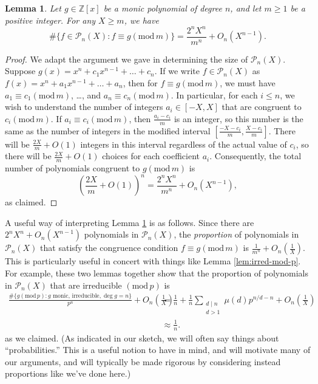 \documentclass[12pt]{amsart}
\newtheorem{lemma}[theorem]{Lemma}
\theoremstyle{definition} \newtheorem*{notation}{Notation}
\theoremstyle{remark} \newtheorem*{remark}{Remark}
\theoremstyle{remark} \newtheorem*{example}{Example}
\theoremstyle{definition} \newtheorem*{definition}{Definition}
\numberwithin{equation}{section}
\numberwithin{theorem}{section}
\renewcommand{\pmod}[1]{\left(\mathrm{mod}\,#1\right)}
\begin{document}
	\begin{lemma} \label{lem:poly-mod-m}
		Let $g \in \mathbb{Z}[x]$ be a monic polynomial of degree $n$, and let $m \geq 1$ be a positive integer.  For any $X \geq m$, we have
			\[
				\#\{ f \in \mathcal{P}_n(X) : f \equiv g \pmod{m}\}
					= \frac{2^n X^n}{m^n} + O_n(X^{n-1}).
			\]
	\end{lemma}
	\begin{proof}
		We adapt the argument we gave in determining the size of $\mathcal{P}_n(X)$.  Suppose $g(x) = x^n + c_1 x^{n-1} + \dots + c_n$.  If we write $f \in \mathcal{P}_n(X)$ as $f(x) = x^n + a_1x^{n-1} + \dots + a_n$, then for $f \equiv g \pmod{m}$, we must have $a_1 \equiv c_1 \pmod{m}$, \dots, and $a_n \equiv c_n \pmod{m}$.  In particular, for each $i \leq n$, we wish to understand the number of integers $a_i \in [-X,X]$ that are congruent to $c_i \pmod{m}$.  If $a_i \equiv c_i \pmod{m}$, then $\frac{a_i-c_i}{m}$ is an integer, so this number is the same as the number of integers in the modified interval $[\frac{-X-c_i}{m},\frac{X-c_i}{m}]$.  There will be $\frac{2X}{m} + O(1)$ integers in this interval regardless of the actual value of $c_i$, so there will be $\frac{2X}{m}+O(1)$ choices for each coefficient $a_i$.  Consequently, the total number of polynomials congruent to $g \pmod{m}$ is
			\[
				\left(\frac{2X}{m}+O(1)\right)^n
					= \frac{2^n X^n}{m^n} + O_n(X^{n-1}),
			\]
		as claimed.
	\end{proof}
	
	A useful way of interpreting Lemma \ref{lem:poly-mod-m} is as follows.  Since there are $2^n X^n + O_n(X^{n-1})$ polynomials in $\mathcal{P}_n(X)$, the \emph{proportion} of polynomials in $\mathcal{P}_n(X)$ that satisfy the congruence condition $f \equiv g \pmod{m}$ is $\frac{1}{m^n} + O_n(\frac{1}{X})$.  This is particularly useful in concert with things like Lemma \ref{lem:irred-mod-p}.  For example, these two lemmas together show that the proportion of polynomials in $\mathcal{P}_n(X)$ that are irreducible $\pmod{p}$ is
		\begin{align*}
			\frac{\#\{ g \pmod{p} : g \text{ monic, irreducible}, \deg g = n\}}{p^n} + O_n\left(\frac{1}{X}\right)
				&= \frac{1}{n} + \frac{1}{n}\sum_{\substack{d \mid n \\ d >1}} \mu(d) p^{n/d - n} + O_n\left(\frac{1}{X}\right) \\
				&\approx \frac{1}{n}.
		\end{align*}
	as we claimed.  (As indicated in our sketch, we will often say things about ``probabilities.''  This is a useful notion to have in mind, and will motivate many of our arguments, and will typically be made rigorous by considering instead proportions like we've done here.)  
	
\end{document}
